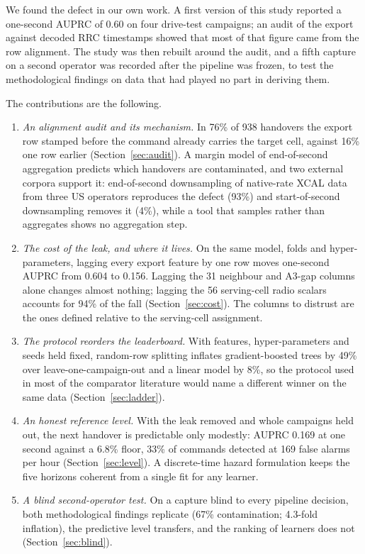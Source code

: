 \documentclass[5p,times,twocolumn]{elsarticle}
\begin{document}
We found the defect in our own work. A first version of this study reported a one-second AUPRC of 0.60 on four drive-test campaigns; an audit of the export against decoded RRC timestamps showed that most of that figure came from the row alignment. The study was then rebuilt around the audit, and a fifth capture on a second operator was recorded after the pipeline was frozen, to test the methodological findings on data that had played no part in deriving them.

The contributions are the following.
\begin{enumerate}
\item \emph{An alignment audit and its mechanism.} In 76\% of 938 handovers the export row stamped before the command already carries the target cell, against 16\% one row earlier (Section~\ref{sec:audit}). A margin model of end-of-second aggregation predicts which handovers are contaminated, and two external corpora support it: end-of-second downsampling of native-rate XCAL data from three US operators reproduces the defect (93\%) and start-of-second downsampling removes it (4\%), while a tool that samples rather than aggregates shows no aggregation step.
\item \emph{The cost of the leak, and where it lives.} On the same model, folds and hyper-parameters, lagging every export feature by one row moves one-second AUPRC from 0.604 to 0.156. Lagging the 31 neighbour and A3-gap columns alone changes almost nothing; lagging the 56 serving-cell radio scalars accounts for 94\% of the fall (Section~\ref{sec:cost}). The columns to distrust are the ones defined relative to the serving-cell assignment.
\item \emph{The protocol reorders the leaderboard.} With features, hyper-parameters and seeds held fixed, random-row splitting inflates gradient-boosted trees by 49\% over leave-one-campaign-out and a linear model by 8\%, so the protocol used in most of the comparator literature would name a different winner on the same data (Section~\ref{sec:ladder}).
\item \emph{An honest reference level.} With the leak removed and whole campaigns held out, the next handover is predictable only modestly: AUPRC 0.169 at one second against a 6.8\% floor, 33\% of commands detected at 169 false alarms per hour (Section~\ref{sec:level}). A discrete-time hazard formulation keeps the five horizons coherent from a single fit for any learner.
\item \emph{A blind second-operator test.} On a capture blind to every pipeline decision, both methodological findings replicate (67\% contamination; 4.3-fold inflation), the predictive level transfers, and the ranking of learners does not (Section~\ref{sec:blind}).
\end{enumerate}
\end{document}
